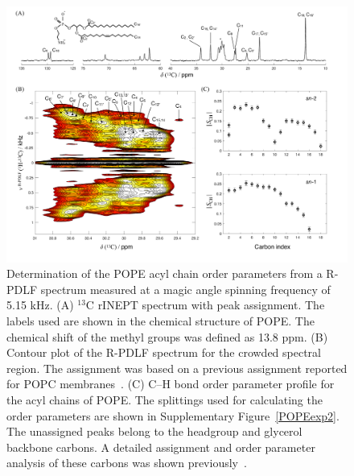 \documentclass[fleqn,10pt]{wlscirepSI}
\begin{document}
\begin{figure}[h]
  \includegraphics[width=\textwidth]{Figures/POPE_INEPT_contour_SCH.pdf}
  \caption{Determination of the POPE acyl chain order parameters from a R-PDLF spectrum measured at a magic angle spinning frequency of 5.15 kHz. (A) $^{13}$C rINEPT spectrum with peak assignment. The labels used are shown in the chemical structure of POPE. The chemical shift of the methyl groups was defined as 13.8 ppm. (B) Contour plot of the R-PDLF spectrum for the crowded spectral region. The assignment was based on a previous assignment reported for POPC membranes~\cite{ferreira13}. (C) C--H bond order parameter profile for the acyl chains of POPE. The splittings used for calculating the order parameters are shown in Supplementary Figure~\ref{POPEexp2}. The unassigned peaks belong to the headgroup and glycerol backbone carbons. A detailed assignment and order parameter analysis of these carbons was shown previously~\cite{bacle21}.      }
  \label{POPEexp1}
\end{figure}
\end{document}
